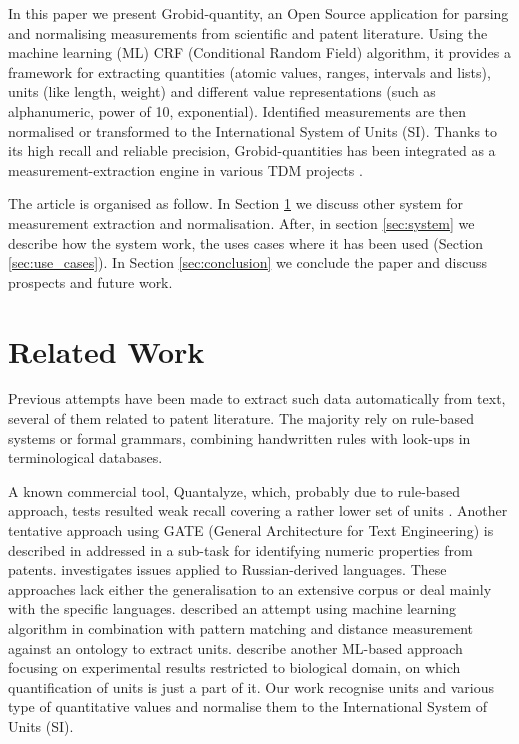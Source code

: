 \documentclass[sigconf]{acmart}
\begin{document}
In this paper we present Grobid-quantity, an Open Source application \cite{grobid-quantities} for parsing and normalising measurements from scientific and patent literature. Using the machine learning (ML) CRF (Conditional Random Field) algorithm, it provides a framework for extracting quantities (atomic values, ranges, intervals and lists), units (like length, weight) and different value representations (such as alphanumeric, power of 10, exponential). Identified measurements are then normalised or transformed to the International System of Units (SI). Thanks to its high recall and reliable precision, Grobid-quantities has been integrated as a measurement-extraction engine in various TDM projects \cite{foppiano2019proposal}.

The article is organised as follow. In Section \ref{sec:related_work} we discuss other system for measurement extraction and normalisation. After, in section \ref{sec:system} we describe how the system work, the uses cases where it has been used (Section \ref{sec:use_cases}). In Section \ref{sec:conclusion} we conclude the paper and discuss prospects and future work. 

\section{Related Work}
\label{sec:related_work}
Previous attempts have been made to extract such data automatically from text, several of them related to patent literature. The majority rely on rule-based systems or formal grammars, combining handwritten rules with look-ups in terminological databases.  

A known commercial tool, Quantalyze, which, probably due to rule-based approach, tests resulted weak recall \cite{hundman2017measurement} covering a rather lower set of units \cite{aras2014applications}. Another tentative approach using GATE (General Architecture for Text Engineering) is described in \cite{agatonovic2008large} addressed in a sub-task for identifying numeric properties from patents. \cite{am2013processing} investigates issues applied to Russian-derived languages. These approaches lack either the generalisation to an extensive corpus or deal mainly with the specific languages. \cite{berrahou2013extract} described an attempt using machine learning algorithm in combination with pattern matching and distance measurement against an ontology to extract units. \cite{kang_extracting_2013} describe another ML-based approach focusing on experimental results restricted to biological domain, on which quantification of units is just a part of it. Our work recognise units and various type of quantitative values and normalise them to the International System of Units (SI). 
\end{document}
